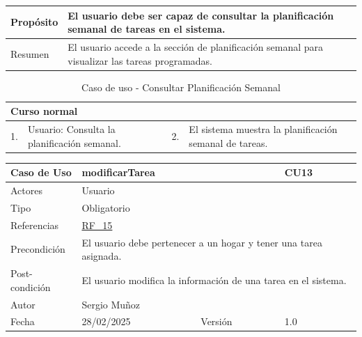 \begin{table}[H]
    \centering
    \begin{tabular}{| m{} | m{} | m{} | m{} |}
        \hline
        Propósito & \multicolumn{3}{m{0.67\textwidth}|}{El usuario debe ser capaz de consultar la planificación semanal de tareas en el sistema.} \\ 
        \hline
        Resumen & \multicolumn{3}{m{0.67\textwidth}|}{El usuario accede a la sección de planificación semanal para visualizar las tareas programadas.} \\ 
        \hline
    \end{tabular}
\end{table}

\begin{table}[H]
    \centering
    \begin{tabular}{| m{} | m{} | m{} | m{} |}
        \hline
        \multicolumn{4}{|m{0.9\textwidth}|}{Curso normal} \\ 
        \hline
        1. & Usuario: Consulta la planificación semanal. 
        & 2. & El sistema muestra la planificación semanal de tareas. \\ 
        \hline
    \end{tabular}
    \caption{Caso de uso - Consultar Planificación Semanal}
\end{table}

\newpage

\begin{table}[H]
    \centering
    \begin{tabular}{| m{} | m{} | m{} | m{} |}
        \hline
        \rowcolor[HTML]{C0C0C0} Caso de Uso & \multicolumn{2}{|m{0.43\textwidth}|}{modificarTarea} &  CU13\\ 
        \hline
        Actores & \multicolumn{3}{l|}{Usuario} \\ 
        \hline
        Tipo & \multicolumn{3}{l|}{Obligatorio} \\ 
        \hline
        Referencias & \multicolumn{3}{l|}{\hyperref[req:RF15]{RF\_15}} \\ 
        \hline
        Precondición & \multicolumn{3}{m{0.67\textwidth}|}{El usuario debe pertenecer a un hogar y tener una tarea asignada.} \\ 
        \hline
        Post-condición & \multicolumn{3}{m{0.67\textwidth}|}{El usuario modifica la información de una tarea en el sistema.} \\ 
        \hline
        Autor & \multicolumn{3}{l|}{Sergio Muñoz} \\ 
        \hline
        Fecha & 28/02/2025 & Versión & 1.0 \\ 
        \hline
    \end{tabular}
\end{table}

